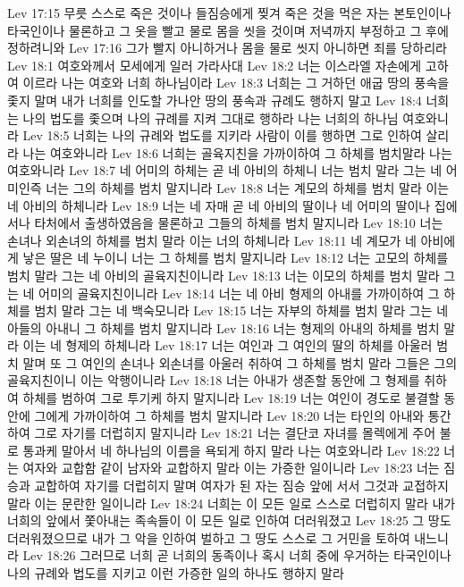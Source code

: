 Lev 17:15  무릇 스스로 죽은 것이나 들짐승에게 찢겨 죽은 것을 먹은 자는 본토인이나 타국인이나 물론하고 그 옷을 빨고 물로 몸을 씻을 것이며 저녁까지 부정하고 그 후에 정하려니와
Lev 17:16  그가 빨지 아니하거나 몸을 물로 씻지 아니하면 죄를 당하리라
Lev 18:1  여호와께서 모세에게 일러 가라사대
Lev 18:2  너는 이스라엘 자손에게 고하여 이르라 나는 여호와 너희 하나님이라
Lev 18:3  너희는 그 거하던 애굽 땅의 풍속을 좇지 말며 내가 너희를 인도할 가나안 땅의 풍속과 규례도 행하지 말고
Lev 18:4  너희는 나의 법도를 좇으며 나의 규례를 지켜 그대로 행하라 나는 너희의 하나님 여호와니라
Lev 18:5  너희는 나의 규례와 법도를 지키라 사람이 이를 행하면 그로 인하여 살리라 나는 여호와니라
Lev 18:6  너희는 골육지친을 가까이하여 그 하체를 범치말라 나는 여호와니라
Lev 18:7  네 어미의 하체는 곧 네 아비의 하체니 너는 범치 말라 그는 네 어미인즉 너는 그의 하체를 범치 말지니라
Lev 18:8  너는 계모의 하체를 범치 말라 이는 네 아비의 하체니라
Lev 18:9  너는 네 자매 곧 네 아비의 딸이나 네 어미의 딸이나 집에서나 타처에서 출생하였음을 물론하고 그들의 하체를 범치 말지니라
Lev 18:10  너는 손녀나 외손녀의 하체를 범치 말라 이는 너의 하체니라
Lev 18:11  네 계모가 네 아비에게 낳은 딸은 네 누이니 너는 그 하체를 범치 말지니라
Lev 18:12  너는 고모의 하체를 범치 말라 그는 네 아비의 골육지친이니라
Lev 18:13  너는 이모의 하체를 범치 말라 그는 네 어미의 골육지친이니라
Lev 18:14  너는 네 아비 형제의 아내를 가까이하여 그 하체를 범치 말라 그는 네 백숙모니라
Lev 18:15  너는 자부의 하체를 범치 말라 그는 네 아들의 아내니 그 하체를 범치 말지니라
Lev 18:16  너는 형제의 아내의 하체를 범치 말라 이는 네 형제의 하체니라
Lev 18:17  너는 여인과 그 여인의 딸의 하체를 아울러 범치 말며 또 그 여인의 손녀나 외손녀를 아울러 취하여 그 하체를 범치 말라 그들은 그의 골육지친이니 이는 악행이니라
Lev 18:18  너는 아내가 생존할 동안에 그 형제를 취하여 하체를 범하여 그로 투기케 하지 말지니라
Lev 18:19  너는 여인이 경도로 불결할 동안에 그에게 가까이하여 그 하체를 범치 말지니라
Lev 18:20  너는 타인의 아내와 통간하여 그로 자기를 더럽히지 말지니라
Lev 18:21  너는 결단코 자녀를 몰렉에게 주어 불로 통과케 말아서 네 하나님의 이름을 욕되게 하지 말라 나는 여호와니라
Lev 18:22  너는 여자와 교합함 같이 남자와 교합하지 말라 이는 가증한 일이니라
Lev 18:23  너는 짐승과 교합하여 자기를 더럽히지 말며 여자가 된 자는 짐승 앞에 서서 그것과 교접하지 말라 이는 문란한 일이니라
Lev 18:24  너희는 이 모든 일로 스스로 더럽히지 말라 내가 너희의 앞에서 쫓아내는 족속들이 이 모든 일로 인하여 더러워졌고
Lev 18:25  그 땅도 더러워졌으므로 내가 그 악을 인하여 벌하고 그 땅도 스스로 그 거민을 토하여 내느니라
Lev 18:26  그러므로 너희 곧 너희의 동족이나 혹시 너희 중에 우거하는 타국인이나 나의 규례와 법도를 지키고 이런 가증한 일의 하나도 행하지 말라
